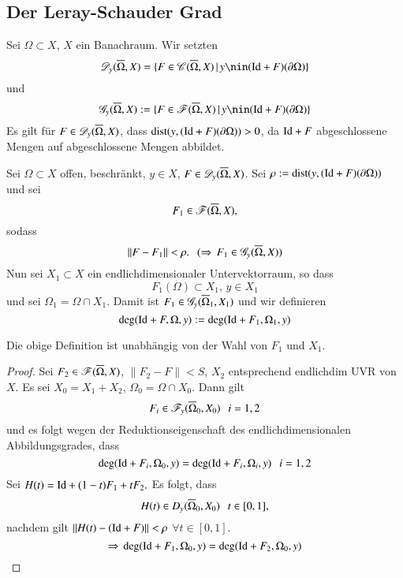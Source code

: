 \subsection{Der Leray-Schauder Grad}

Sei $\Omega\subset X$, $X$ ein Banachraum. Wir setzten
\[
    \ms D_y(\ol \Omega,X)=\{ F\in \ms C(\ol\Omega,X)\, | \, y\nin(\Id + F)(\partial \Omega) \}
\]
und
\[
    \ms G_y(\ol\Omega,X):=\{F\in \ms F(\ol \Omega,X)\, |\, y\nin(\Id+F)(\partial\Omega)\}
\]
Es gilt für $F\in \mathscr D_y(\overline \Omega,X)$, dass $\mathrm{dist}(y,(\mathrm{Id}+F)(\partial\Omega))>0$, da $\mathrm{Id}+F$
abgeschlossene Mengen auf abgeschlossene Mengen abbildet.

\begin{defi}\label{3.8}
    Sei $\Omega\subset X$ offen, beschränkt, $y\in X$, $F\in \mathscr D_y(\overline \Omega,X)$. Sei $\rho:=
    \mathrm{dist}(y,(\mathrm{Id}+F)(\partial \Omega))$ und sei
    \[
        F_1\in \mathscr F(\overline \Omega, X),
    \]
    sodass
    \[
        \|F-F_1\|<\rho. \hspace{.25cm} (\Rightarrow \, F_1\in \mathscr G_y(\overline \Omega,X))
    \]
    Nun sei $X_1\subset X$ ein endlichdimensionaler Untervektorraum, so dass
    \[
        F_1(\Omega)\subset X_1,\, y\in X_1
    \] 
    und sei $\Omega_1=\Omega\cap X_1$. Damit ist $F_1\in \mathscr G_y(\overline\Omega_1,X_1)$ und wir definieren
    \[
        \deg(\mathrm{Id}+F,\Omega,y):=\deg(\mathrm{Id}+F_1,\Omega_1,y)
    \]
\end{defi}

\begin{prop}\label{3.9}
    Die obige Definition ist unabhängig von der Wahl von $F_1$ und $X_1$.
\end{prop}

\begin{proof}
    Sei $F_2\in \mathscr F (\overline \Omega,X)$, $\|F_2-F\|<S$, $X_2$ entsprechend endlichdim UVR von $X$. Es sei
    $X_0=X_1+X_2$, $\Omega_0=\Omega\cap X_0$. Dann gilt
    \[
        F_i\in \mathscr F_y(\overline\Omega_0,X_0) \hspace{.25cm} i=1,2
    \]
    und es folgt wegen der Reduktionseigenschaft des endlichdimensionalen Abbildungsgrades, dass
    \[
        \deg(\mathrm{Id} + F_i,\Omega_0,y)=\deg(\mathrm{Id}+F_i,\Omega_i,y)\hspace{.25cm} i=1,2
    \]
    Sei $H(t)=\mathrm{Id} + (1-t)F_1+tF_2.$ Es folgt, dass
    \[
        H(t)\in D_y(\overline\Omega_0,X_0) \hspace{.25cm} t\in [0,1],
    \]
    nachdem gilt $\|H(t)-(\mathrm{Id}+F)\|<\rho$ $\forall t\in [0,1]$.
    \[
        \Rightarrow \, \deg(\mathrm{Id}+F_1,\Omega_0,y)=\deg(\mathrm{Id}+F_2,\Omega_0,y)
    \]
\end{proof}

